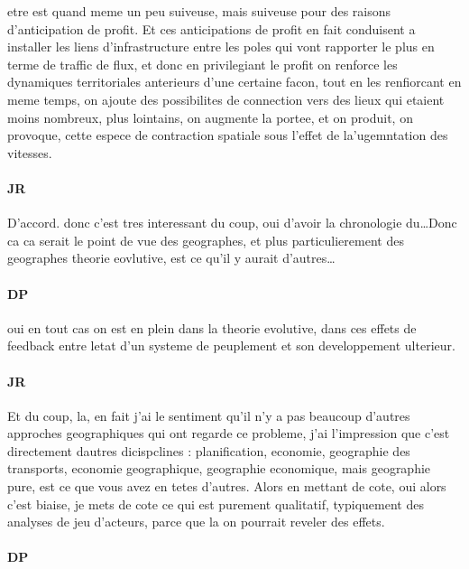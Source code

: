\documentclass[12pt]{article}
\begin{document}
etre est quand meme un peu suiveuse, mais suiveuse pour des raisons d'anticipation de profit. Et ces anticipations de profit en fait conduisent a installer les liens d'infrastructure entre les poles qui vont rapporter le plus en terme de traffic de flux, et donc en privilegiant le profit on renforce les dynamiques territoriales anterieurs d'une certaine facon, tout en les renfiorcant en meme temps, on ajoute des possibilites de connection vers des lieux qui etaient moins nombreux, plus lointains, on augmente la portee, et on produit, on provoque, cette espece de contraction spatiale sous l'effet de la'ugemntation des vitesses.

\paragraph{JR}

D'accord. donc c'est tres interessant du coup, oui d'avoir la chronologie du\ldots Donc ca ca serait le point de vue des geographes, et plus particulierement des geographes theorie eovlutive, est ce qu'il y aurait d'autres\ldots

\paragraph{DP}

oui en tout cas on est en plein dans la theorie evolutive, dans ces effets de feedback entre letat d'un systeme de peuplement et son developpement ulterieur.

\paragraph{JR}

Et du coup, la, en fait j'ai le sentiment qu'il n'y a pas beaucoup d'autres approches geographiques qui ont regarde ce probleme, j'ai l'impression que c'est directement dautres dicispclines : planification, economie, geographie des transports, economie geographique, geographie economique, mais geographie pure, est ce que vous avez en tetes d'autres. Alors en mettant de cote, oui alors c'est biaise, je mets de cote ce qui est purement qualitatif, typiquement des analyses de jeu d'acteurs, parce que la on pourrait reveler des effets.

\paragraph{DP}
\end{document}
